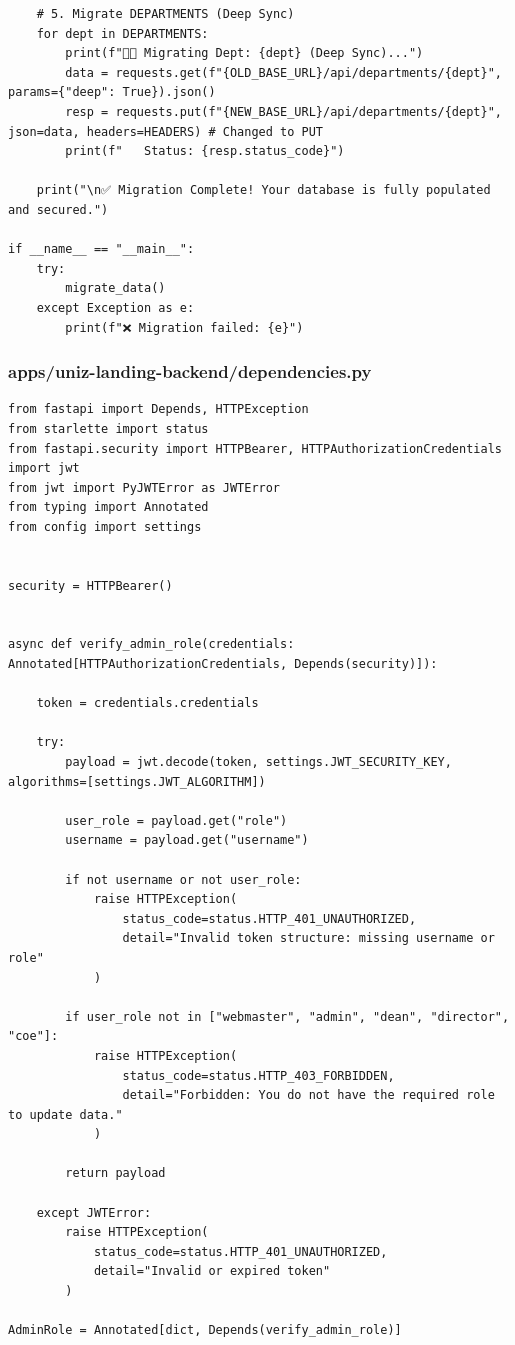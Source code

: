 \documentclass[11pt,a4paper,oneside]{article}
\begin{document}
\begin{lstlisting}
    # 5. Migrate DEPARTMENTS (Deep Sync)
    for dept in DEPARTMENTS:
        print(f"👨‍🏫 Migrating Dept: {dept} (Deep Sync)...")
        data = requests.get(f"{OLD_BASE_URL}/api/departments/{dept}", params={"deep": True}).json()
        resp = requests.put(f"{NEW_BASE_URL}/api/departments/{dept}", json=data, headers=HEADERS) # Changed to PUT
        print(f"   Status: {resp.status_code}")

    print("\n✅ Migration Complete! Your database is fully populated and secured.")

if __name__ == "__main__":
    try:
        migrate_data()
    except Exception as e:
        print(f"❌ Migration failed: {e}")
\end{lstlisting}
\subsubsection*{apps/uniz-landing-backend/dependencies.py}
\begin{lstlisting}
from fastapi import Depends, HTTPException
from starlette import status
from fastapi.security import HTTPBearer, HTTPAuthorizationCredentials
import jwt
from jwt import PyJWTError as JWTError
from typing import Annotated
from config import settings


security = HTTPBearer()


async def verify_admin_role(credentials: Annotated[HTTPAuthorizationCredentials, Depends(security)]):
    
    token = credentials.credentials 
    
    try:
        payload = jwt.decode(token, settings.JWT_SECURITY_KEY, algorithms=[settings.JWT_ALGORITHM])
        
        user_role = payload.get("role")
        username = payload.get("username")
        
        if not username or not user_role:
            raise HTTPException(
                status_code=status.HTTP_401_UNAUTHORIZED, 
                detail="Invalid token structure: missing username or role"
            )
            
        if user_role not in ["webmaster", "admin", "dean", "director", "coe"]:
            raise HTTPException(
                status_code=status.HTTP_403_FORBIDDEN, 
                detail="Forbidden: You do not have the required role to update data."
            )
            
        return payload 
        
    except JWTError:
        raise HTTPException(
            status_code=status.HTTP_401_UNAUTHORIZED, 
            detail="Invalid or expired token"
        )

AdminRole = Annotated[dict, Depends(verify_admin_role)]
\end{lstlisting}
\end{document}
